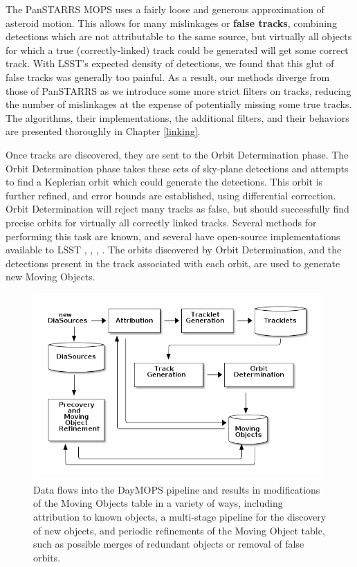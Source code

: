 The PanSTARRS MOPS uses a fairly loose and generous approximation of
asteroid motion.  This allows for many mislinkages or \textbf{false
  tracks}, combining detections which are not attributable to the same
source, but virtually all objects for which a true (correctly-linked)
track could be generated will get some correct track.  With LSST's
expected density of detections, we found that this glut of false
tracks was generally too painful.  As a result, our methods diverge
from those of PanSTARRS as we introduce some more strict filters on
tracks, reducing the number of mislinkages at the expense of
potentially missing some true tracks.  The algorithms, their
implementations, the additional filters, and their behaviors are
presented thoroughly in Chapter \ref{linking}.

Once tracks are discovered, they are sent to the Orbit Determination
phase. The Orbit Determination phase takes these sets of sky-plane
detections and attempts to find a Keplerian orbit which could generate
the detections.  This orbit is further refined, and error bounds are
established, using differential correction.  Orbit Determination will
reject many tracks as false, but should successfully find precise
orbits for virtually all correctly linked tracks.  Several methods for
performing this task are known, and several have open-source implementations
available to LSST \citep{Milani04orbitdetermination},
\citep{Milani2006}, \citep{OpenOrb2009}, \citep{granvik_thesis}.  The
orbits discovered by Orbit Determination, and the detections present
in the track associated with each orbit, are used to generate new
Moving Objects.

\begin{figure}[h]
\begin{center}
  \includegraphics[width=11cm]{illustrations/mopsDiagram.png}
\end{center}
\caption{ Data flows into the DayMOPS pipeline and results in
  modifications of the Moving Objects table in a variety of ways,
  including attribution to known objects, a multi-stage pipeline for
  the discovery of new objects, and periodic refinements of the Moving
  Object table, such as possible merges of redundant objects or
  removal of false orbits. }
\label{mopsDiagram}
\end{figure}



